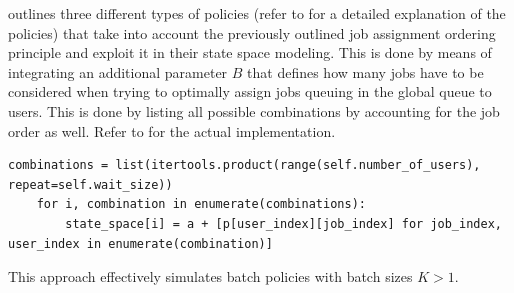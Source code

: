  outlines three different types of policies (refer to  for a detailed explanation of the policies) that take into account the previously outlined job assignment ordering principle and exploit it in their state space modeling. This is done by means of integrating an additional parameter $B$ that defines how many jobs have to be considered when trying to optimally assign jobs queuing in the global queue to users. This is done by listing all possible combinations by accounting for the job order as well. Refer to  for the actual implementation.

\begin{lstlisting}[caption=State space modeling by considering $B$ jobs from the global queue and integrating all possible combinations,label=lst:wz_combinations,style=CustomPython]
	combinations = list(itertools.product(range(self.number_of_users), repeat=self.wait_size))
    for i, combination in enumerate(combinations):
        state_space[i] = a + [p[user_index][job_index] for job_index, user_index in enumerate(combination)]
\end{lstlisting}

This approach effectively simulates batch policies with batch sizes $K>1$.